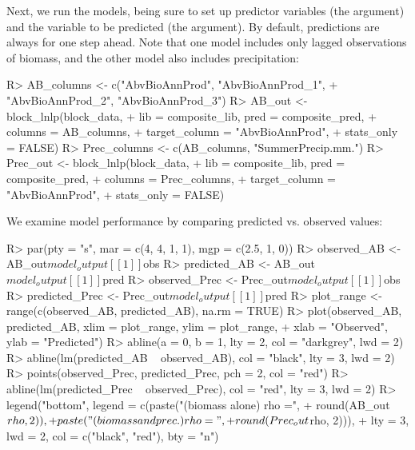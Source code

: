 \documentclass[article]{jss}
\begin{document}
Next, we run the models, being sure to set up predictor variables (the  argument) and the variable to be predicted (the  argument). By default, predictions are always for one step ahead. Note that one model includes only lagged observations of biomass, and the other model also includes precipitation:

\begin{Schunk}
\begin{Sinput}
R> AB_columns <- c("AbvBioAnnProd", "AbvBioAnnProd_1", 
+                  "AbvBioAnnProd_2", "AbvBioAnnProd_3")
R> AB_out <- block_lnlp(block_data, 
+                       lib = composite_lib, pred = composite_pred, 
+                       columns = AB_columns, 
+                       target_column = "AbvBioAnnProd", 
+                       stats_only = FALSE)
R> Prec_columns <- c(AB_columns, "SummerPrecip.mm.")
R> Prec_out <- block_lnlp(block_data,
+                         lib = composite_lib, pred = composite_pred, 
+                         columns = Prec_columns, 
+                         target_column = "AbvBioAnnProd", 
+                         stats_only = FALSE)
\end{Sinput}
\end{Schunk}

We examine model performance by comparing predicted vs. observed values:
\begin{Schunk}
\begin{Sinput}
R> par(pty = "s", mar = c(4, 4, 1, 1), mgp = c(2.5, 1, 0))
R> observed_AB <- AB_out$model_output[[1]]$obs
R> predicted_AB <- AB_out$model_output[[1]]$pred
R> observed_Prec <- Prec_out$model_output[[1]]$obs
R> predicted_Prec <- Prec_out$model_output[[1]]$pred
R> plot_range <- range(c(observed_AB, predicted_AB), na.rm = TRUE)
R> plot(observed_AB, predicted_AB, xlim = plot_range, ylim = plot_range, 
+       xlab = "Observed", ylab = "Predicted")
R> abline(a = 0, b = 1, lty = 2, col = "darkgrey", lwd = 2)
R> abline(lm(predicted_AB ~ observed_AB), col = "black", lty = 3, lwd = 2)
R> points(observed_Prec, predicted_Prec, pch = 2, col = "red")
R> abline(lm(predicted_Prec ~ observed_Prec), col = "red", lty = 3, lwd = 2)
R> legend("bottom", legend = c(paste("(biomass alone) rho =", 
+                                    round(AB_out$rho, 2)), 
+                               paste("(biomass and prec.) rho =", 
+                                     round(Prec_out$rho, 2))), 
+         lty = 3, lwd = 2, col = c("black", "red"), bty = "n")
\end{Sinput}
\end{Schunk}
\end{document}
